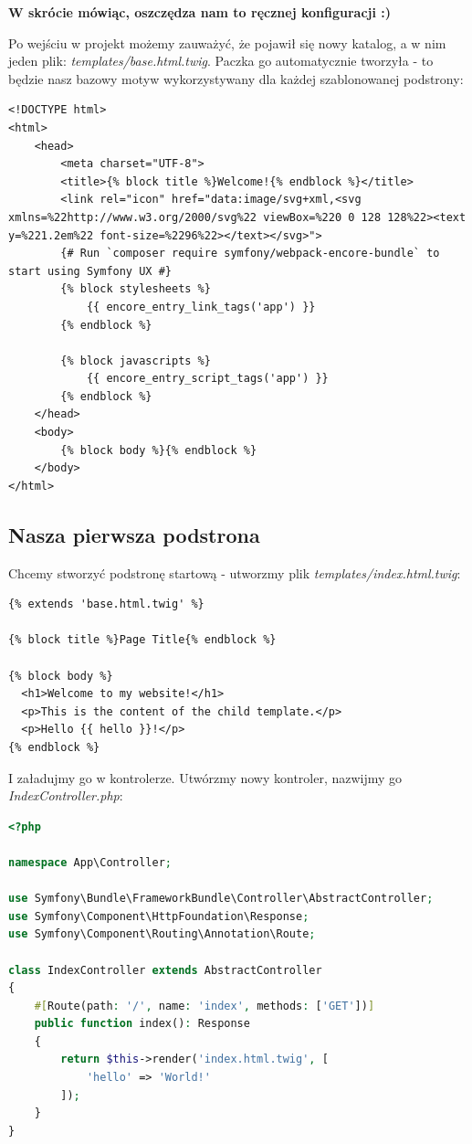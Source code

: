 \documentclass[polish, a4paper]{article}
\begin{document}
\textbf{W skrócie mówiąc, oszczędza nam to ręcznej konfiguracji :)}

Po wejściu w projekt możemy zauważyć, że pojawił się nowy katalog, a w nim jeden plik: \emph{templates/base.html.twig}. Paczka go automatycznie tworzyła - to będzie nasz bazowy motyw wykorzystywany dla każdej szablonowanej podstrony:

\begin{lstlisting}[caption=templates/base.html.twig]
<!DOCTYPE html>
<html>
    <head>
        <meta charset="UTF-8">
        <title>{% block title %}Welcome!{% endblock %}</title>
        <link rel="icon" href="data:image/svg+xml,<svg xmlns=%22http://www.w3.org/2000/svg%22 viewBox=%220 0 128 128%22><text y=%221.2em%22 font-size=%2296%22></text></svg>">
        {# Run `composer require symfony/webpack-encore-bundle` to start using Symfony UX #}
        {% block stylesheets %}
            {{ encore_entry_link_tags('app') }}
        {% endblock %}

        {% block javascripts %}
            {{ encore_entry_script_tags('app') }}
        {% endblock %}
    </head>
    <body>
        {% block body %}{% endblock %}
    </body>
</html>
\end{lstlisting}

\subsection{Nasza pierwsza podstrona}

Chcemy stworzyć podstronę startową - utworzmy plik \emph{templates/index.html.twig}:

\begin{lstlisting}[caption=templates/index.html.twig]
{% extends 'base.html.twig' %}

{% block title %}Page Title{% endblock %}

{% block body %}
  <h1>Welcome to my website!</h1>
  <p>This is the content of the child template.</p>
  <p>Hello {{ hello }}!</p>
{% endblock %}
\end{lstlisting}

I załadujmy go w kontrolerze. Utwórzmy nowy kontroler, nazwijmy go \emph{IndexController.php}:

\begin{lstlisting}[language=PHP, caption=Controller/IndexController.php]
<?php

namespace App\Controller;

use Symfony\Bundle\FrameworkBundle\Controller\AbstractController;
use Symfony\Component\HttpFoundation\Response;
use Symfony\Component\Routing\Annotation\Route;

class IndexController extends AbstractController
{
    #[Route(path: '/', name: 'index', methods: ['GET'])]
    public function index(): Response
    {
        return $this->render('index.html.twig', [
            'hello' => 'World!'
        ]);
    }
}
\end{lstlisting}
\end{document}
